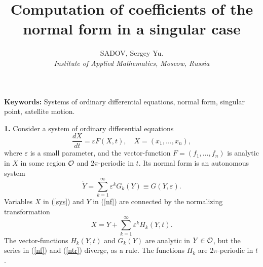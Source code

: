 
\title{Computation of coefficients of the normal form
     in a singular case}
\author{SADOV, Sergey Yu.\\
{\it Institute of Applied Mathematics,
Moscow, Russia }
}
\date{}
\def\eps{\varepsilon}
\def\oM{\mathop{\bf M}\nolimits}
\def\oL{\mathop{\bf L}\nolimits}
\def\gp{\gamma_+}   \def\gm{\gamma_-}  \def\gpm{\gamma_{\pm}}
\def\dst{\displaystyle}
\newtheorem{prp}{Proposition}
\renewcommand{\theprp}{}
\newtheorem{cnj}{Conjecture}
\renewcommand{\thecnj}{}
\newtheorem{tm}{Theorem}
%

\maketitle

\noindent
{\bf Keywords:} Systems of ordinary differential equations, normal form,
singular point, satellite motion.

\noindent
{\bf 1.\quad} Consider a  system of ordinary differential equations
\begin{equation}
\label{sys}
\frac{dX}{dt}= \eps F(X,t), \quad X=(x_1,\dots,x_n),
\end{equation}
where $\eps$ is a small parameter, and the
vector-function $F=(f_1,\dots,f_n)$
is analytic in $X$ in some region $\cal O$
and $2\pi$-periodic in $t$.
Its normal form is an autonomous system
\begin{equation}
\label{nf}
\dot Y =\sum_{k=1}^{\infty}\eps^k G_{k}(Y) \equiv G(Y,\eps).
\end{equation}
Variables $X$ in (\ref{sys}) and $Y$ in (\ref{nf})
are connected by the normalizing trans\-for\-mation
\begin{equation}
\label{ntr}
X=Y+\sum_{k=1}^{\infty} \eps^k H_{k}(Y,t).
\end{equation}
The vector-functions $H_k(Y,t)$ and $G_k(Y)$
are analytic in $Y\in\cal O$, but the series in
(\ref{nf}) and (\ref{ntr}) diverge, as a rule.
The functions $H_k$ are $2\pi$-periodic in $t$.

